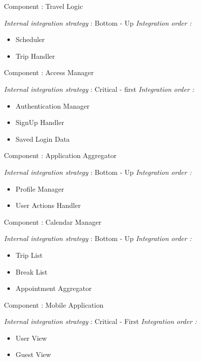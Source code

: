 Component : Travel Logic

\textit{Internal integration strategy} : Bottom - Up
\textit{Integration order :}
	\begin{itemize}
		\item Scheduler
		\item Trip Handler
		
	\end{itemize}
	

Component : Access Manager

\textit{Internal integration strategy} : Critical - first
\textit{Integration order :}
	\begin{itemize}
		\item Authentication Manager
		\item SignUp Handler
		\item Saved Login Data
	\end{itemize}
		
Component : Application Aggregator

\textit{Internal integration strategy} : Bottom - Up
\textit{Integration order :}
	\begin{itemize}
		\item Profile Manager
		\item User Actions Handler
\end{itemize}
	
Component : Calendar Manager

\textit{Internal integration strategy} : Bottom - Up
\textit{Integration order :}
	\begin{itemize}
		\item Trip List
		\item Break List
		\item Appointment Aggregator
	\end{itemize}
	

	




Component : Mobile Application

\textit{Internal integration strategy} : Critical - First
\textit{Integration order :}
	\begin{itemize}
		\item User View
		\item Guest View
	\end{itemize}
	
